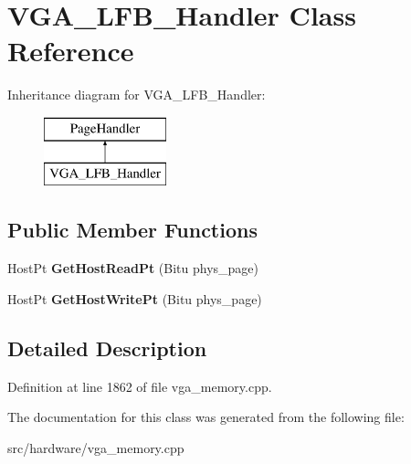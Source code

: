 \hypertarget{classVGA__LFB__Handler}{\section{V\-G\-A\-\_\-\-L\-F\-B\-\_\-\-Handler Class Reference}
\label{classVGA__LFB__Handler}
}
Inheritance diagram for V\-G\-A\-\_\-\-L\-F\-B\-\_\-\-Handler\-:\begin{figure}[H]
\begin{center}
\leavevmode
\includegraphics[height=2.000000cm]{classVGA__LFB__Handler}
\end{center}
\end{figure}
\subsection*{Public Member Functions}
\begin{DoxyCompactItemize}
\item 
\hypertarget{classVGA__LFB__Handler_ad4cf94e4a3b186e307f54fc0ca5f8a33}{Host\-Pt {\bfseries Get\-Host\-Read\-Pt} (Bitu phys\-\_\-page)}\label{classVGA__LFB__Handler_ad4cf94e4a3b186e307f54fc0ca5f8a33}

\item 
\hypertarget{classVGA__LFB__Handler_abc42ff47ee5307b3de27bed8594a1354}{Host\-Pt {\bfseries Get\-Host\-Write\-Pt} (Bitu phys\-\_\-page)}\label{classVGA__LFB__Handler_abc42ff47ee5307b3de27bed8594a1354}

\end{DoxyCompactItemize}


\subsection{Detailed Description}


Definition at line 1862 of file vga\-\_\-memory.\-cpp.



The documentation for this class was generated from the following file\-:\begin{DoxyCompactItemize}
\item 
src/hardware/vga\-\_\-memory.\-cpp\end{DoxyCompactItemize}
